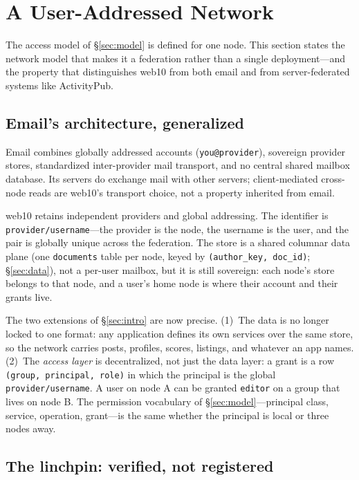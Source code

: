\documentclass[sigconf, nonacm]{acmart}
\begin{document}
\section{A User-Addressed Network}
\label{sec:network}

The access model of \S\ref{sec:model} is defined for one node. This section
states the network model that makes it a federation rather than a single
deployment---and the property that distinguishes web10 from both email and
from server-federated systems like ActivityPub.

\subsection{Email's architecture, generalized}

Email combines globally addressed accounts (\texttt{you@provider}), sovereign
provider stores, standardized inter-provider mail transport, and no central
shared mailbox database. Its servers do exchange mail with other servers;
client-mediated cross-node reads are web10's transport choice, not a property
inherited from email.

web10 retains independent providers and global addressing. The identifier is
\texttt{provider/username}---the provider is the node, the username is the
user, and the pair is globally unique across the federation. The store is a
shared columnar data plane (one \texttt{documents} table per node, keyed by
\texttt{(author\_key, doc\_id)}; \S\ref{sec:data}), not a per-user mailbox,
but it is still sovereign: each node's store belongs to that node, and a
user's home node is where their account and their grants live.

The two extensions of \S\ref{sec:intro} are now precise. (1)~The data is no
longer locked to one format: any application defines its own services over
the same store, so the network carries posts, profiles, scores, listings,
and whatever an app names. (2)~The \emph{access layer} is decentralized, not
just the data layer: a grant is a row \texttt{(group, principal, role)} in
which the principal is the global \texttt{provider/username}. A user on node
A can be granted \texttt{editor} on a group that lives on node B. The
permission vocabulary of \S\ref{sec:model}---principal class, service,
operation, grant---is the same whether the principal is local or three nodes
away.

\subsection{The linchpin: verified, not registered}
\end{document}
